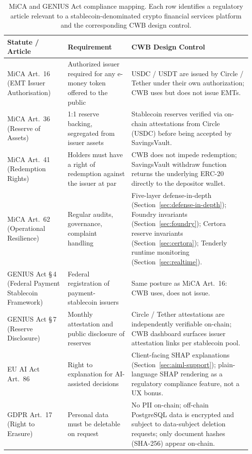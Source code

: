 \documentclass[12pt,a4paper]{report}
\begin{document}
\begin{table}[H]
\centering
\caption{MiCA and GENIUS Act compliance mapping. Each row identifies a regulatory article relevant to a stablecoin-denominated crypto financial services platform and the corresponding CWB design control.}
\label{tab:mica-mapping}
\small
\begin{tabular}{p{3.2cm}p{4.6cm}p{5.8cm}}
\hline
\textbf{Statute / Article} & \textbf{Requirement} & \textbf{CWB Design Control} \\
\hline
MiCA Art.~16 (EMT Issuer Authorisation) & Authorized issuer required for any e-money token offered to the public & USDC / USDT are issued by Circle / Tether under their own authorization; CWB uses but does not issue EMTs. \\
\hline
MiCA Art.~36 (Reserve of Assets) & 1{:}1 reserve backing, segregated from issuer assets & Stablecoin reserves verified via on-chain attestations from Circle (USDC) before being accepted by SavingsVault. \\
\hline
MiCA Art.~41 (Redemption Rights) & Holders must have a right of redemption against the issuer at par & CWB does not impede redemption; SavingsVault withdraw function returns the underlying ERC-20 directly to the depositor wallet. \\
\hline
MiCA Art.~62 (Operational Resilience) & Regular audits, governance, complaint handling & Five-layer defense-in-depth (Section~\ref{sec:defense-in-depth}); Foundry invariants (Section~\ref{sec:foundry}); Certora reserve invariants (Section~\ref{sec:certora}); Tenderly runtime monitoring (Section~\ref{sec:realtime}). \\
\hline
GENIUS Act \S\,4 (Federal Payment Stablecoin Framework) & Federal registration of payment-stablecoin issuers & Same posture as MiCA Art.~16: CWB uses, does not issue. \\
\hline
GENIUS Act \S\,7 (Reserve Disclosure) & Monthly attestation and public disclosure of reserves & Circle / Tether attestations are independently verifiable on-chain; CWB dashboard surfaces issuer attestation links per stablecoin pool. \\
\hline
EU AI Act Art.~86 & Right to explanation for AI-assisted decisions & Client-facing SHAP explanations (Section~\ref{sec:aiml-support}); plain-language SHAP rendering as a regulatory compliance feature, not a UX bonus. \\
\hline
GDPR Art.~17 (Right to Erasure) & Personal data must be deletable on request & No PII on-chain; off-chain PostgreSQL data is encrypted and subject to data-subject deletion requests; only document hashes (SHA-256) appear on-chain. \\
\hline
\end{tabular}
\end{table}
\end{document}
